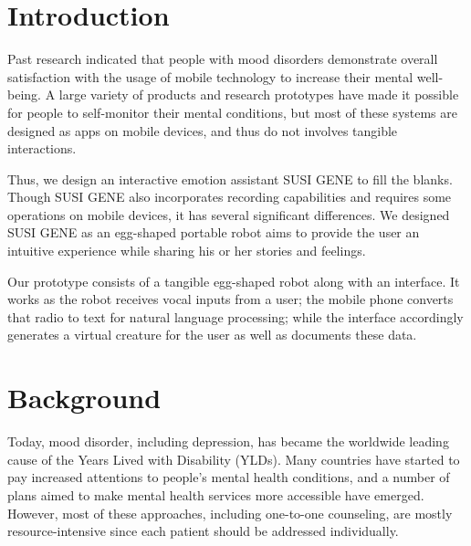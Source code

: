 \documentclass[manuscript,screen]{acmart}
\begin{document}
\maketitle

\section{Introduction}

Past research indicated that people with mood disorders demonstrate overall satisfaction with the usage of mobile technology to increase their mental well-being.\cite{proudfoot2010community}
A large variety of products and research prototypes have made it possible for people to self-monitor their mental conditions, but most of these systems are designed as apps on mobile devices, and thus do not involves tangible interactions.

Thus, we design an interactive emotion assistant SUSI GENE to fill the blanks. Though SUSI GENE also incorporates recording capabilities and requires some operations on mobile devices, it has several significant differences. We designed SUSI GENE as an egg-shaped portable robot aims to provide the user an intuitive experience while sharing his or her stories and feelings. 

Our prototype consists of a tangible egg-shaped robot along with an interface. It works as the robot receives vocal inputs from a user; the mobile phone converts that radio to text for natural language processing; while the interface accordingly generates a virtual creature for the user as well as documents these data.


\section{Background}

Today, mood disorder, including depression, has became the worldwide leading cause of the Years Lived with Disability (YLDs). Many countries have started to pay increased attentions to people’s mental health conditions, and a number of plans aimed to make mental health services more accessible have emerged. However, most of these approaches, including one-to-one counseling, are mostly resource-intensive since each patient should be addressed individually.\cite{world2019special}
\end{document}
